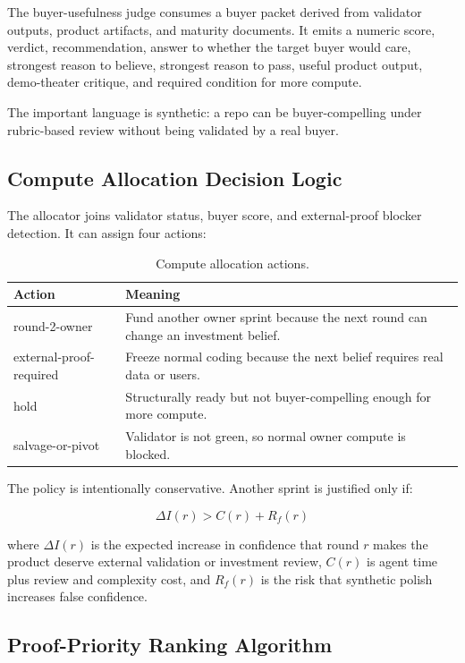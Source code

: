 \documentclass[11pt]{article}
\begin{document}
The buyer-usefulness judge consumes a buyer packet derived from validator outputs, product artifacts, and maturity documents. It emits a numeric score, verdict, recommendation, answer to whether the target buyer would care, strongest reason to believe, strongest reason to pass, useful product output, demo-theater critique, and required condition for more compute.

The important language is synthetic: a repo can be buyer-compelling under rubric-based review without being validated by a real buyer.

\subsection{Compute Allocation Decision Logic}

The allocator joins validator status, buyer score, and external-proof blocker detection. It can assign four actions:

\begin{table}[!htbp]
\centering
\begin{tabularx}{\linewidth}{>{\ttfamily}l Y}
\toprule
Action & Meaning \\
\midrule
round-2-owner & Fund another owner sprint because the next round can change an investment belief. \\
external-proof-required & Freeze normal coding because the next belief requires real data or users. \\
hold & Structurally ready but not buyer-compelling enough for more compute. \\
salvage-or-pivot & Validator is not green, so normal owner compute is blocked. \\
\bottomrule
\end{tabularx}
\caption{Compute allocation actions.}
\end{table}

The policy is intentionally conservative. Another sprint is justified only if:

\[
\Delta I(r) > C(r) + R_f(r)
\]

where $\Delta I(r)$ is the expected increase in confidence that round $r$ makes the product deserve external validation or investment review, $C(r)$ is agent time plus review and complexity cost, and $R_f(r)$ is the risk that synthetic polish increases false confidence.

\subsection{Proof-Priority Ranking Algorithm}
\end{document}
